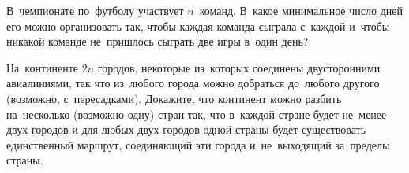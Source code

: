 \begin{problems}
\item
В~чемпионате по~футболу участвует $n$~команд.
В~какое минимальное число дней его можно организовать так, чтобы каждая команда
сыграла с~каждой и~чтобы никакой команде не~пришлось сыграть две игры в~один
день?

\item
На~континенте $2n$ городов, некоторые из~которых соединены двусторонними
авиалиниями, так что из~любого города можно добраться до~любого другого
(возможно, с~пересадками).
Докажите, что континент можно разбить на~несколько (возможно одну) стран так,
что в~каждой стране будет не~менее двух городов и для любых двух городов одной
страны будет существовать единственный маршрут, соединяющий эти города
и~не~выходящий за~пределы страны.

\end{problems}

